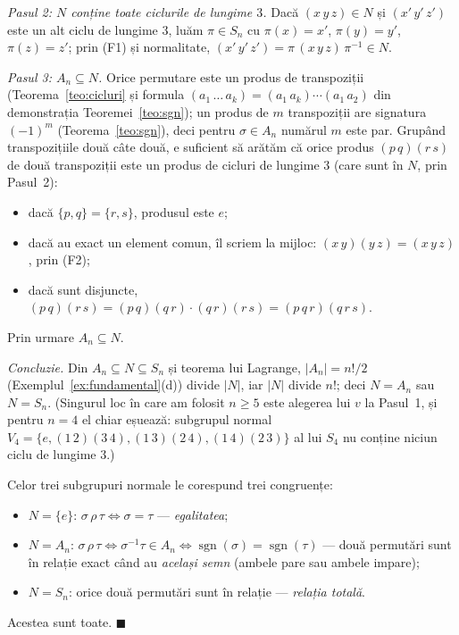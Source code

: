 \begin{solutie}
\smallskip
\textit{Pasul 2: $N$ conține toate ciclurile de lungime $3$.} Dacă
$(x\,y\,z)\in N$ și $(x'\,y'\,z')$ este un alt ciclu de lungime $3$,
luăm $\pi\in S_{n}$ cu $\pi(x)=x'$, $\pi(y)=y'$, $\pi(z)=z'$; prin (F1) și
normalitate, $(x'\,y'\,z')=\pi\,(x\,y\,z)\,\pi^{-1}\in N$.

\smallskip
\textit{Pasul 3: $A_{n}\subseteq N$.} Orice permutare este un produs de
transpoziții (Teorema~\ref{teo:cicluri} și formula
$(a_{1}\,\dots\,a_{k})=(a_{1}\,a_{k})\cdots(a_{1}\,a_{2})$ din demonstrația
Teoremei~\ref{teo:sgn}); un produs de $m$ transpoziții are signatura
$(-1)^{m}$ (Teorema~\ref{teo:sgn}), deci pentru $\sigma\in A_{n}$ numărul
$m$ este par. Grupând transpozițiile două câte două, e suficient să
arătăm că orice produs $(p\,q)(r\,s)$ de două transpoziții este un produs
de cicluri de lungime $3$ (care sunt în $N$, prin Pasul~2):
\begin{itemize}[nosep,leftmargin=1.4em]
  \item dacă $\{p,q\}=\{r,s\}$, produsul este $e$;
  \item dacă au exact un element comun, îl scriem la mijloc:
        $(x\,y)(y\,z)=(x\,y\,z)$, prin (F2);
  \item dacă sunt disjuncte,
        $(p\,q)(r\,s)=(p\,q)(q\,r)\cdot(q\,r)(r\,s)=(p\,q\,r)(q\,r\,s)$.
\end{itemize}
Prin urmare $A_{n}\subseteq N$.

\smallskip
\textit{Concluzie.} Din $A_{n}\subseteq N\subseteq S_{n}$ și teorema lui
Lagrange, $|A_{n}|=n!/2$ (Exemplul~\ref{ex:fundamental}(d)) divide $|N|$,
iar $|N|$ divide $n!$; deci $N=A_{n}$ sau $N=S_{n}$. (Singurul loc în care
am folosit $n\ge 5$ este alegerea lui $v$ la Pasul~1, și pentru $n=4$ el
chiar eșuează: subgrupul normal
$V_{4}=\{e,(1\,2)(3\,4),(1\,3)(2\,4),(1\,4)(2\,3)\}$ al lui $S_{4}$ nu
conține niciun ciclu de lungime $3$.)

\smallskip
Celor trei subgrupuri normale le corespund trei congruențe:
\begin{itemize}[nosep,leftmargin=1.4em]
  \item $N=\{e\}$: $\sigma\,\rho\,\tau\iff\sigma=\tau$ --- \emph{egalitatea};
  \item $N=A_{n}$: $\sigma\,\rho\,\tau\iff\sigma^{-1}\tau\in A_{n}\iff
        \operatorname{sgn}(\sigma)=\operatorname{sgn}(\tau)$ --- două
        permutări sunt în relație exact când au \emph{același
        semn} (ambele pare sau ambele impare);
  \item $N=S_{n}$: orice două permutări sunt în relație ---
        \emph{relația totală}.
\end{itemize}
Acestea sunt toate. $\blacksquare$
\end{solutie}

